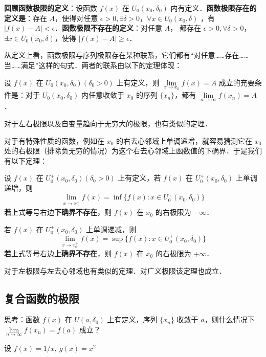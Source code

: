 \textbf{回顾函数极限的定义}：设函数 $f(x)$ 在 $U_0(x_0,\delta_0)$ 内有定义．\textbf{函数极限存在的定义是}：存在 $A$，使得对任意 $\epsilon >0, \exists \delta>0$，$\forall x\in U_0(x_0,\delta)$ ，有 $|f(x)-A|<\epsilon$．\textbf{函数极限不存在的定义}：对任意 $A$， 都存在 $\epsilon>0,\forall \delta>0$，$\exists x\in U_0(x_0,\delta)$，使得 $|f(x)-A|\ge \epsilon$．

从定义上看，函数极限与序列极限存在某种联系，它们都有“对任意……存在……当……满足”这样的句式．两者的联系由以下的定理体现：

\begin{theorem}{}
设 $f(x)$ 在 $U_0(x_0,\delta_0)(\delta_0>0)$ 上有定义，则 $\lim\limits_{x\rightarrow x_0}f(x)=A$ 成立的充要条件是：对于 $U_0(x_0,\delta_0)$ 内任意收敛于 $x_0$ 的序列 $\{x_n\}$，都有 $\lim\limits_{n\rightarrow \infty}f(x_n)=A$．

对于左右极限以及自变量趋向于无穷大的极限，也有类似的定理．
\end{theorem}

对于有特殊性质的函数，例如在 $x_0$ 的右去心邻域上单调递增，就容易猜测它在 $x_0$ 处的右极限（排除负无穷的情况）为这个右去心邻域上函数值的下确界．于是我们有以下定理：
\begin{theorem}{}
设 $f(x)$ 在 $U_0^+(x_0,\delta_0)(\delta_0>0)$ 上有定义，若 $f(x)$ 在  $U_0^+(x_0,\delta_0)$ 上单调递增，则
\begin{equation}
  \lim\limits_{x\rightarrow x_0^+}f(x)=\inf\{f(x):x\in U_0^+(x_0,\delta_0)\}
\end{equation}
\textbf{若}上式等号右边\textbf{下确界不存在}，则 $f(x)$ 在 $x_0$ 的右极限为 $-\infty$．

若 $f(x)$ 在  $U_0^+(x_0,\delta_0)$ 上单调递减，则
\begin{equation}
\lim\limits_{x\rightarrow x_0^+}f(x)=\sup\{f(x):x\in U_0^+(x_0,\delta_0)\}
\end{equation}
\textbf{若}上式等号右边\textbf{上确界不存在}，则 $f(x)$ 在 $x_0$ 的右极限为 $+\infty$．

对于左极限与左去心邻域也有类似的定理．对广义极限该定理也成立．
\end{theorem}




\subsection{复合函数的极限}
\begin{exercise}{}
思考：函数 $f(x)$ 在 $U(a,\delta_0)$ 上有定义，序列 $\{x_n\}$ 收敛于 $a$，则什么情况下 $\lim\limits_{n\rightarrow \infty}f(x_n)=f(a)$ 成立？
\end{exercise}
设 $f(x)=1/x,\ g(x)=x^2$

